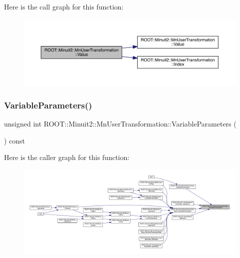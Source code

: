 Here is the call graph for this function\+:\nopagebreak
\begin{figure}[H]
\begin{center}
\leavevmode
\includegraphics[width=350pt]{d9/d98/classROOT_1_1Minuit2_1_1MnUserTransformation_a89cf5aca1d345e0d2d069ad6a54ff94d_cgraph}
\end{center}
\end{figure}
\mbox{\label{classROOT_1_1Minuit2_1_1MnUserTransformation_a6e88cb38d0d19f4cf9ed3dd8102eebef}} 
\subsubsection{\texorpdfstring{VariableParameters()}{VariableParameters()}\hspace{0.1cm}{\footnotesize\ttfamily [1/2]}}
{\footnotesize\ttfamily unsigned int R\+O\+O\+T\+::\+Minuit2\+::\+Mn\+User\+Transformation\+::\+Variable\+Parameters (\begin{DoxyParamCaption}{ }\end{DoxyParamCaption}) const\hspace{0.3cm}{\ttfamily [inline]}}

Here is the caller graph for this function\+:\nopagebreak
\begin{figure}[H]
\begin{center}
\leavevmode
\includegraphics[width=350pt]{d9/d98/classROOT_1_1Minuit2_1_1MnUserTransformation_a6e88cb38d0d19f4cf9ed3dd8102eebef_icgraph}
\end{center}
\end{figure}
\mbox{\label{classROOT_1_1Minuit2_1_1MnUserTransformation_a6e88cb38d0d19f4cf9ed3dd8102eebef}} 
